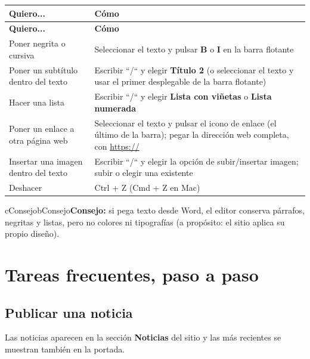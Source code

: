 \documentclass[11pt,letterpaper]{report}
\begin{document}
\begin{longtable}{>{\raggedright\arraybackslash}p{}>{\raggedright\arraybackslash}p{}}
\rowcolor{h2vazul}\textbf{\color{white}Quiero...} & \textbf{\color{white}Cómo} \\
\endfirsthead
\rowcolor{h2vazul}\textbf{\color{white}Quiero...} & \textbf{\color{white}Cómo} \\
\endhead
Poner negrita o cursiva & Seleccionar el texto y pulsar \textbf{B} o \textbf{I} en la barra flotante \\ \midrule
\rowcolor{filaalt}Poner un subtítulo dentro del texto & Escribir “/“ y elegir \textbf{Título 2} (o seleccionar el texto y usar el primer desplegable de la barra flotante) \\ \midrule
Hacer una lista & Escribir “/“ y elegir \textbf{Lista con viñetas} o \textbf{Lista numerada} \\ \midrule
\rowcolor{filaalt}Poner un enlace a otra página web & Seleccionar el texto y pulsar el icono de enlace (el último de la barra); pegar la dirección web completa, con \url{https://} \\ \midrule
Insertar una imagen dentro del texto & Escribir “/“ y elegir la opción de subir/insertar imagen; subir o elegir una existente \\ \midrule
\rowcolor{filaalt}Deshacer & Ctrl + Z (Cmd + Z en Mac) \\ \bottomrule
\end{longtable}
\begin{recuadro}{cConsejo}{bConsejo}\textbf{\color{bConsejo}Consejo:} si pega texto desde Word, el editor conserva párrafos, negritas y listas, pero no colores ni tipografías (a propósito: el sitio aplica su propio diseño).\end{recuadro}
\chapter{Tareas frecuentes, paso a paso}
\section{Publicar una noticia}
Las noticias aparecen en la sección \textbf{Noticias} del sitio y las más recientes se muestran también en la portada.
\end{document}

